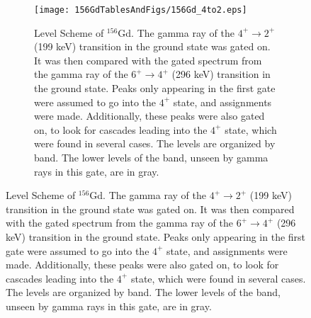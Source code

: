 \begin{landscape}
\begin{figure}[!]
    \centering
    \begin{subfigure}{1.4\textwidth}
    \texttt{[image: 156GdTablesAndFigs/156Gd\_4to2.eps]}
    \caption{\label{fig:156_4to2level}Level Scheme of $^{156}$Gd. The gamma ray of the $4^+\rightarrow2^+$ (199 keV) transition in the ground state was gated on. It was then compared with the gated spectrum from the gamma ray of the $6^+\rightarrow4^+$ (296 keV) transition in the ground state. Peaks only appearing in the first gate were assumed to go into the $4^+$ state, and assignments were made. Additionally, these peaks were also gated on, to look for cascades leading into the $4^+$ state, which were found in several cases. The levels are organized by band. The lower levels of the band, unseen by gamma rays in this gate, are in gray.}
    \end{subfigure}
    \label{fig:156_4to2}
    \end{figure}
\end{landscape}

